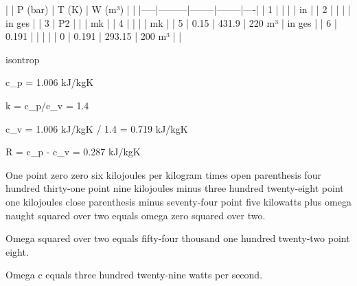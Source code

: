 |     | P (bar) | T (K)  | W (m³) |    |
|-----|---------|--------|--------|----|
| 1   |         |        |        | in |
| 2   |         |        |        | in ges |
| 3   | P2      |        |        | mk |
| 4   |         |        |        | mk |
| 5   | 0.15    | 431.9  | 220 m³ | in ges |
| 6   | 0.191   |        |        |    |
| 0   | 0.191   | 293.15 | 200 m³ |    |

isontrop

c_p = 1.006 kJ/kgK

k = c_p/c_v = 1.4

c_v = 1.006 kJ/kgK / 1.4 = 0.719 kJ/kgK

R = c_p - c_v = 0.287 kJ/kgK

One point zero zero six kilojoules per kilogram times open parenthesis four hundred thirty-one point nine kilojoules minus three hundred twenty-eight point one kilojoules close parenthesis minus seventy-four point five kilowatts plus omega naught squared over two equals omega zero squared over two.

Omega squared over two equals fifty-four thousand one hundred twenty-two point eight.

Omega c equals three hundred twenty-nine watts per second.